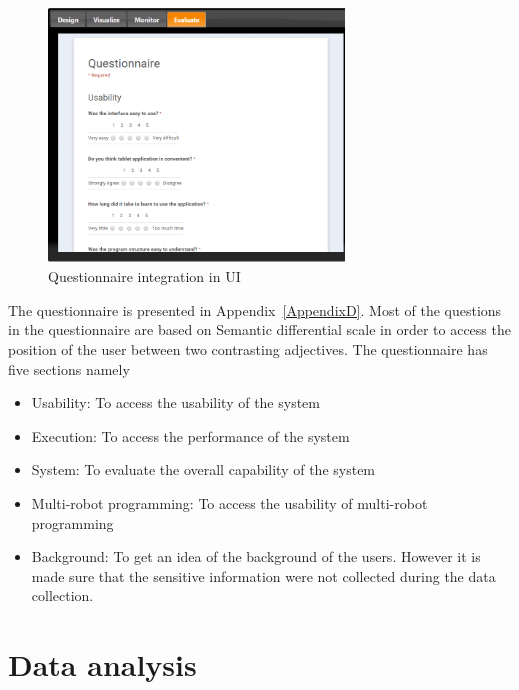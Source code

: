 \begin{figure}[H]
\centering
\includegraphics[width=0.7\textwidth]{../thesis/assets/questionnaire_integration.png}
\caption[Questionnaire integration in UI]{Questionnaire integration in UI}
\label{fig:ui_evaluate}
\end{figure}

The questionnaire is presented in Appendix~\ref{AppendixD}. Most of the questions in the questionnaire are based on Semantic differential scale in order to access the position of the user between two contrasting adjectives. The questionnaire has five sections namely
\begin{itemize}
\item Usability: To access the usability of the system
\item Execution: To access the performance of the system
\item System: To evaluate the overall capability of the system
\item Multi-robot programming: To access the usability of multi-robot programming
\item Background: To get an idea of the background of the users. However it is made sure that the sensitive information were not collected during the data collection.
\end{itemize}

\section{Data analysis}


